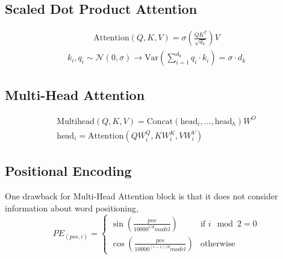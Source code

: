 \subsection{Scaled Dot Product Attention}
\begin{align*}
\text{Attention}(Q,K,V) = \sigma\left(\frac{QK^T}{\sqrt{d_k}}\right)V
\end{align*}
\begin{align*}
k_i, q_i\sim\mathcal{N}(0,\sigma)\rightarrow\text{Var}\left(\sum_{i=1}^{d_k}q_i\cdot k_i\right)=\sigma\cdot d_k
\end{align*}
\subsection{Multi-Head Attention}
\begin{align*}
\text{Multihead}(Q,K,V)=\text{Concat}(\text{head}_i,\dots,\text{head}_h)W^O \\
\text{head}_i = \text{Attention}(QW_i^{Q}, KW_i^K,VW_i^V)
\end{align*}
\subsection{Positional Encoding}
One drawback for Multi-Head Attention block is that it does not consider information about word positioning, 
\[ PE_{(pos,i)} = \begin{cases} 
\sin\left(\frac{pos}{10000^{i/d}model}\right) & \text{if }i \mod 2 = 0 \\
\cos\left(\frac{pos}{10000^{(i-1)/d}model}\right) & \text{otherwise}
       \end{cases}
    \]